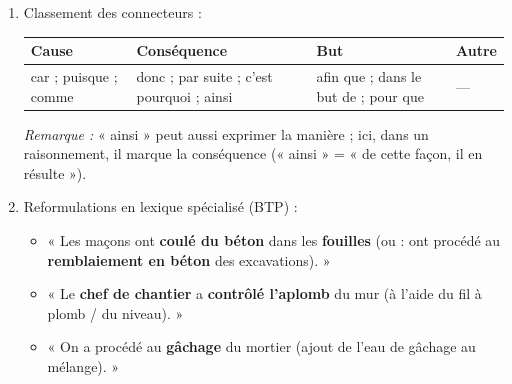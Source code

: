 \documentclass[11pt]{article}
\begin{document}
\begin{corrige}
\begin{enumerate}
    \item Classement des connecteurs :
    \begin{center}
    \begin{tabularx}{\linewidth}{|X|X|X|X|}\hline
    \textbf{Cause} & \textbf{Conséquence} & \textbf{But} & \textbf{Autre} \\ \hline
    car ; puisque ; comme & donc ; par suite ; c'est pourquoi ; ainsi & afin que ; dans le but de ; pour que & --- \\ \hline
    \end{tabularx}
    \end{center}
    \emph{Remarque :} « ainsi » peut aussi exprimer la manière ; ici, dans un raisonnement, il marque la conséquence (« ainsi » = « de cette façon, il en résulte »).
    \item Reformulations en lexique spécialisé (BTP) :
    \begin{itemize}
        \item[a)] « Les maçons ont \textbf{coulé du béton} dans les \textbf{fouilles} (ou : ont procédé au \textbf{remblaiement en béton} des excavations). »
        \item[b)] « Le \textbf{chef de chantier} a \textbf{contrôlé l'aplomb} du mur (à l'aide du fil à plomb / du niveau). »
        \item[c)] « On a procédé au \textbf{gâchage} du mortier (ajout de l'eau de gâchage au mélange). »
    \end{itemize}
\end{enumerate}
\end{corrige}
\end{document}
